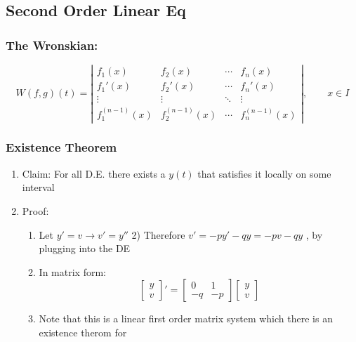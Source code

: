 \documentclass[11pt]{article}
\begin{document}
\subsection{Second Order Linear Eq}
\label{sec-9-2}
\subsubsection{The Wronskian:}
\label{sec-9-2-1}

\begin{equation}
W(f,g)(t) = \left |
\begin{array}{cccc}
         f_1(x) & f_2(x) & \cdots & f_n(x) \\
         f_1'(x) & f_2'(x) & \cdots & f_n' (x)\\
         \vdots & \vdots & \ddots & \vdots \\
         f_1^{(n-1)}(x)& f_2^{(n-1)}(x) & \cdots & f_n^{(n-1)}(x)
\end{array} \right |,\qquad x\in I
\end{equation}
\subsubsection{Existence Theorem}
\label{sec-9-2-2}

\begin{enumerate}
\item Claim: For all D.E. there exists a $y(t)$ that satisfies it
       locally on some interval
\item Proof:
\begin{enumerate}
\item Let $y'=v \rightarrow v'=y''$         2) Therefore $v'=-py'-qy=-pv-qy$ , by plugging into the DE
\item In matrix form:
           \begin{equation}
           \left [
           \begin{array}{c}
           y\\v
           \end{array} \right ]'=
           \left [
           \begin{array}{lr}
           0 & 1\\
           -q & -p
           \end{array} \right ]
           \left [
           \begin{array}{c}
           y\\v
           \end{array} \right ]
           \end{equation}
\item Note that this is a linear first order matrix system which there
           is an existence therom for
\end{enumerate}
\end{enumerate}
\end{document}
